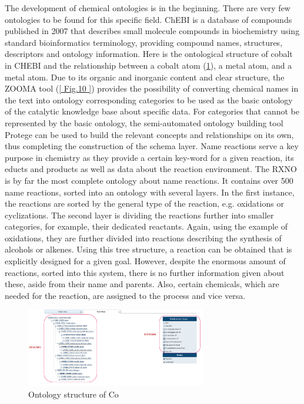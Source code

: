 \documentclass[%
 aip,
 jmp,%
 amsmath,amssymb,
 reprint,%
]{revtex4-2}
\begin{document}
The development of chemical ontologies is in the beginning. There are very few ontologies to be found 
for this specific field. ChEBI is a database of compounds published in 2007 that 
describes small molecule compounds in biochemistry using standard bioinformatics terminology, providing compound names, structures, 
descriptors and ontology information. Here is the ontological structure of cobalt in CHEBI and the relationship between a cobalt atom (\ref{ Fig.9 }), 
a metal atom, and a metal atom. Due to its organic and inorganic content and clear structure, the ZOOMA tool (\ref{ Fig.10 }) provides the possibility 
of converting chemical names in the text into ontology corresponding categories to be used as the basic ontology of the catalytic 
knowledge base about specific data. For categories that cannot be represented by the basic ontology, the semi-automated ontology 
building tool Protege can be used to build the relevant concepts and relationships on its own, thus completing the construction of the 
schema layer.
Name reactions serve a key purpose in chemistry as they provide a certain key-word for a given reaction, 
its educts and products as well as data about the reaction environment. The RXNO is by far the most 
complete ontology about name reactions. It contains over 500 name reactions, sorted into an ontology with
several layers. In the first instance, the reactions are sorted by the general type of the reaction, e.g.
oxidations or cyclizations. The second layer is dividing the reactions further into smaller categories,
for example, their dedicated reactants. Again, using the example of oxidations, they are further divided
into reactions describing the synthesis of alcohols or alkenes. Using this tree structure,
a reaction can be obtained that is explicitly designed for a given goal. However, despite the enormous
amount of reactions, sorted into this system, there is no further information given about these, aside
from their name and parents. Also, certain chemicals, which are needed for the reaction, are assigned
to the process and vice versa.


\begin{figure}[htbp]
 \centering
 \includegraphics[width=0.7\textwidth]{figure/9.png}
 \caption{ Ontology structure of Co }
 \label{ Fig.9 }
\end{figure}
\end{document}
